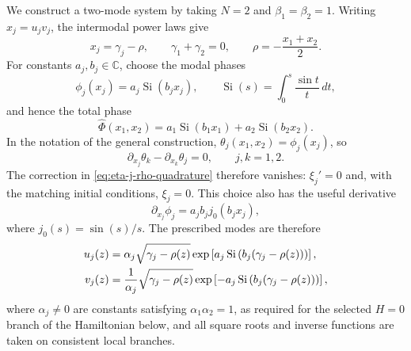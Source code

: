 \documentclass[11pt,a4paper]{article}
\numberwithin{equation}{section}
\begin{document}
We construct a two-mode system by taking $N=2$ and $\beta_1=\beta_2=1$.
Writing $x_j=u_jv_j$, the intermodal power laws give
\begin{equation}
    x_j=\gamma_j-\rho,
    \qquad
    \gamma_1+\gamma_2=0,
    \qquad
    \rho=-\frac{x_1+x_2}{2}. \label{eq:inverse-j1-modal-powers}
\end{equation}
For constants $a_j,b_j\in\mathbb{C}$, choose the modal phases
\begin{equation}
    \phi_j(x_j)=a_j\operatorname{Si}(b_jx_j),
    \qquad
    \operatorname{Si}(s)=\int_0^s\frac{\sin t}{t}\,dt,
\end{equation}
and hence the total phase
\begin{equation}
    \widehat{\Phi}(x_1,x_2)
    =a_1\operatorname{Si}(b_1x_1)
    +a_2\operatorname{Si}(b_2x_2). \label{eq:inverse-j1-total-phase}
\end{equation}
In the notation of the general construction, $\theta_j(x_1,x_2)=\phi_j(x_j)$, so
\begin{equation}
    \partial_{x_j}\theta_k-\partial_{x_k}\theta_j=0,
    \qquad j,k=1,2.
\end{equation}
The correction in \eqref{eq:eta-j-rho-quadrature} therefore vanishes: $\xi_j'=0$ and, with the matching initial conditions, $\xi_j=0$.
This choice also has the useful derivative
\begin{equation}
    \partial_{x_j}\phi_j
    =a_jb_jj_0(b_jx_j),
\end{equation}
where $j_0(s)=\sin(s)/s$.
The prescribed modes are therefore
\begin{align}
    u_j(z)
    &=\alpha_j\sqrt{\gamma_j-\rho(z)}
    \exp\left[a_j\operatorname{Si}\left(b_j(\gamma_j-\rho(z))\right)\right], \notag \\
    v_j(z)
    &=\frac{1}{\alpha_j}\sqrt{\gamma_j-\rho(z)}
    \exp\left[-a_j\operatorname{Si}\left(b_j(\gamma_j-\rho(z))\right)\right],
    \label{eq:inverse-j1-mode-solutions}
\end{align}
where $\alpha_j\ne0$ are constants satisfying $\alpha_1\alpha_2=1$, as required for the selected $H=0$ branch of the Hamiltonian below, and all square roots and inverse functions are taken on consistent local branches.
\end{document}
